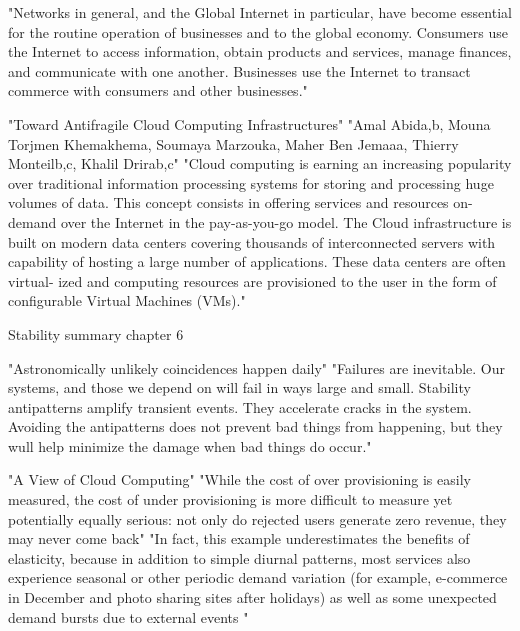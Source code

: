 {"Networks in general, and the Global Internet in particular, have become essential for the routine operation of businesses and to the global economy. Consumers use the Internet to access information, obtain products and services, manage finances, and communicate with one another. Businesses use the Internet to transact commerce with consumers and other businesses."



"Toward Antifragile Cloud Computing Infrastructures" "Amal Abida,b, Mouna Torjmen Khemakhema, Soumaya Marzouka, Maher Ben Jemaaa, Thierry Monteilb,c, Khalil Drirab,c"
"Cloud computing is earning an increasing popularity over traditional information processing systems for storing and processing huge volumes of data. This concept consists in offering services and resources on-demand over the Internet in the pay-as-you-go model. The Cloud infrastructure is built on modern data centers covering thousands of interconnected servers with capability of hosting a large number of applications. These data centers are often virtual- ized and computing resources are provisioned to the user in the form of configurable Virtual Machines (VMs)."



Stability summary chapter 6 \cite[p. 117]{nygard2007release}

"Astronomically unlikely coincidences happen daily"
"Failures are inevitable. Our systems, and those we depend on will fail in ways large and small. Stability antipatterns amplify transient events. They accelerate cracks in the system. Avoiding the antipatterns does not prevent bad things from happening, but they wull help minimize the damage when bad things do occur."


"A View of Cloud Computing"
"While the cost of over provisioning is easily measured, the cost of under provisioning is more difficult to measure yet potentially equally serious: not only do rejected users generate zero revenue, they may never come back"
"In fact, this example underestimates the benefits of elasticity, because in addition to simple diurnal patterns, most services also experience seasonal or other periodic demand variation (for example, e-commerce in December and photo sharing sites after holidays) as well as some unexpected demand bursts due to external events "
}







